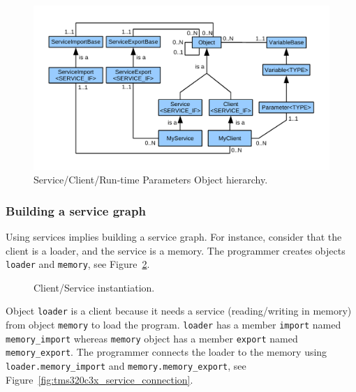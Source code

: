 \begin{figure}[!h]
	\begin{center}
		\includegraphics[width=\textwidth]{tms320c3x/fig_object_hierarchy.pdf}
	\end{center}
	\caption{Service/Client/Run-time Parameters Object hierarchy.}
	\label{fig:tms320c3x_object_hierarchy}
\end{figure}

\subsubsection{Building a service graph}
\label{tms320c3x_building_a_service_graph}

Using services implies building a service graph.
For instance, consider that the client is a loader, and the service is a memory.
The programmer creates objects \texttt{loader} and \texttt{memory}, see Figure~\ref{fig:tms320c3x_service_instanciation}.

\begin{figure}[h]
  \begin{center}
    
    \caption{\label{fig:tms320c3x_service_instanciation} Client/Service instantiation.}
  \end{center}
\end{figure}

Object \texttt{loader} is a client because it needs a service (reading/writing in memory) from object \texttt{memory} to load the program.
\texttt{loader} has a member \texttt{import} named \texttt{memory\_import} whereas \texttt{memory} object has a member \texttt{export} named \texttt{memory\_export}.
The programmer connects the loader to the memory using \texttt{loader.memory\_import} and \texttt{memory.memory\_export}, see Figure~\ref{fig:tms320c3x_service_connection}.

